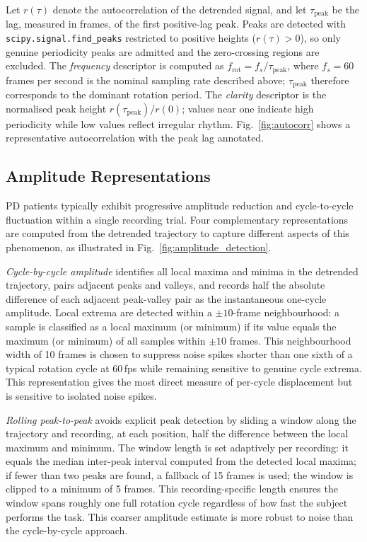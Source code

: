 Let $r(\tau)$ denote the autocorrelation of the detrended signal, and let $\tau_{\mathrm{peak}}$ be the lag, measured in frames, of the first positive-lag peak. Peaks are detected with \texttt{scipy.signal.find\_peaks} restricted to positive heights ($r(\tau) > 0$), so only genuine periodicity peaks are admitted and the zero-crossing regions are excluded. The \emph{frequency} descriptor is computed as $f_{\mathrm{rot}} = f_s / \tau_{\mathrm{peak}}$, where $f_s=60$ frames per second is the nominal sampling rate described above; $\tau_{\mathrm{peak}}$ therefore corresponds to the dominant rotation period. The \emph{clarity} descriptor is the normalised peak height $r(\tau_{\mathrm{peak}})/r(0)$; values near one indicate high periodicity while low values reflect irregular rhythm. Fig.~\ref{fig:autocorr} shows a representative autocorrelation with the peak lag annotated.

\subsection{Amplitude Representations}
\label{sec:fe2}

PD patients typically exhibit progressive amplitude reduction and cycle-to-cycle fluctuation within a single recording trial. Four complementary representations are computed from the detrended trajectory to capture different aspects of this phenomenon, as illustrated in Fig.~\ref{fig:amplitude_detection}.

\emph{Cycle-by-cycle amplitude} identifies all local maxima and minima in the detrended trajectory, pairs adjacent peaks and valleys, and records half the absolute difference of each adjacent peak-valley pair as the instantaneous one-cycle amplitude. Local extrema are detected within a $\pm 10$-frame neighbourhood: a sample is classified as a local maximum (or minimum) if its value equals the maximum (or minimum) of all samples within $\pm 10$ frames. This neighbourhood width of 10 frames is chosen to suppress noise spikes shorter than one sixth of a typical rotation cycle at 60\,fps while remaining sensitive to genuine cycle extrema. This representation gives the most direct measure of per-cycle displacement but is sensitive to isolated noise spikes.

\emph{Rolling peak-to-peak} avoids explicit peak detection by sliding a window along the trajectory and recording, at each position, half the difference between the local maximum and minimum. The window length is set adaptively per recording: it equals the median inter-peak interval computed from the detected local maxima; if fewer than two peaks are found, a fallback of 15 frames is used; the window is clipped to a minimum of 5 frames. This recording-specific length ensures the window spans roughly one full rotation cycle regardless of how fast the subject performs the task. This coarser amplitude estimate is more robust to noise than the cycle-by-cycle approach.

